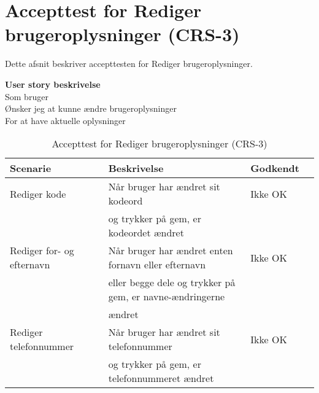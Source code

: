\section{Accepttest for Rediger brugeroplysninger (CRS-3)}
Dette afsnit beskriver accepttesten for Rediger brugeroplysninger.

\textbf{User story beskrivelse} \\
Som bruger\\
Ønsker jeg at kunne ændre brugeroplysninger \\
For at have aktuelle oplysninger

\begin{table}[H]
	\centering
	\begin{tabular}{|ll|l|ll|} \hline
		\textbf{Scenarie} &  & \textbf{Beskrivelse}&  \textbf{Godkendt}&  \\ \hline
		Rediger kode&  &  Når bruger har ændret sit kodeord &  Ikke OK&  \\
		& & og trykker på gem, er kodeordet ændret& & \\ \hline
		Rediger for- og efternavn&  &  Når bruger har ændret enten fornavn eller efternavn &  Ikke OK&  \\
		& & eller begge dele og trykker på gem, er navne-ændringerne & & \\
		& & ændret& & \\ \hline
		Rediger telefonnummer&  &  Når bruger har ændret sit telefonnummer &  Ikke OK&  \\
		& & og trykker på gem, er telefonnummeret ændret& & \\ \hline
	\end{tabular}
	\caption{Accepttest for Rediger brugeroplysninger (CRS-3)}
	\label{AcceptRedigerBruger}
\end{table}
